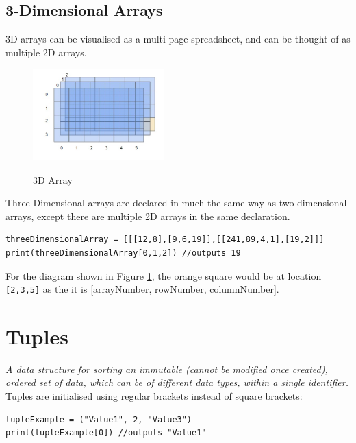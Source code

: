 \documentclass[a4paper,11pt, twocolumn]{article}
\begin{document}
\subsection{3-Dimensional Arrays}
3D arrays can be visualised as a multi-page spreadsheet, and can be thought of as multiple 2D arrays. 
\begin{figure}[H]
    \centering
    \includegraphics[width=0.45\textwidth]{3dArray.jpg}
    \label{fig:3dArray}
    \caption{3D Array}
\end{figure}
\noindent Three-Dimensional arrays are declared in much the same way as two dimensional arrays, except there are multiple 2D arrays in the same declaration.
\begin{Verbatim}[breaklines=true, breakanywhere=true]
threeDimensionalArray = [[[12,8],[9,6,19]],[[241,89,4,1],[19,2]]]
print(threeDimensionalArray[0,1,2]) //outputs 19
\end{Verbatim}
For the diagram shown in Figure \ref{fig:3dArray}, the orange square would be at location \verb|[2,3,5]| as the it is [arrayNumber, rowNumber, columnNumber].

\section{Tuples}
\textit{A data structure for sorting an immutable (cannot be modified once created), ordered set of data, which can be of different data types, within a single identifier.}\\
Tuples are initialised using regular brackets instead of square brackets:
\begin{Verbatim}[breaklines=true, breakanywhere=true]
tupleExample = ("Value1", 2, "Value3") 
print(tupleExample[0]) //outputs "Value1"
\end{Verbatim}
\end{document}
